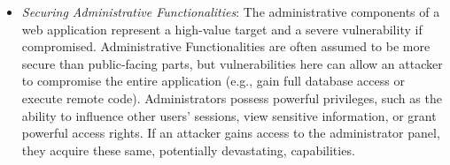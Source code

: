 \begin{itemize}
    \item \textit{Securing Administrative Functionalities}: The administrative components of a web application represent a high-value target and a severe vulnerability if compromised. Administrative Functionalities are often assumed to be more secure than public-facing parts, but vulnerabilities here can allow an attacker to compromise the entire application (e.g., gain full database access or execute remote code). Administrators possess powerful privileges, such as the ability to influence other users' sessions, view sensitive information, or grant powerful access rights. If an attacker gains access to the administrator panel, they acquire these same, potentially devastating, capabilities.
\end{itemize}